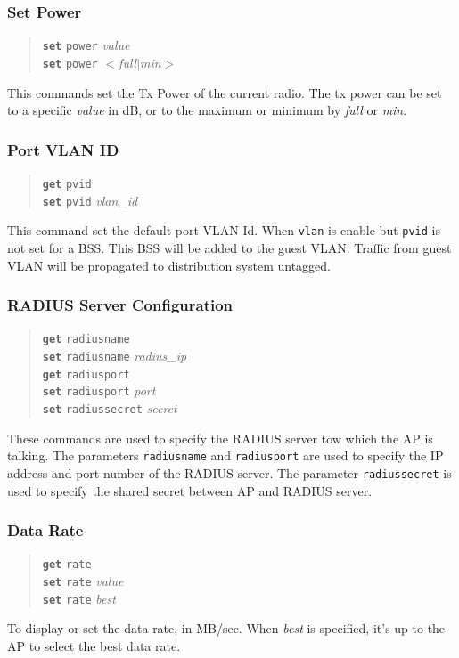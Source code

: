 \documentclass[10pt,fullpage]{article}
\newcommand{\bv}{\begin{verse}}
\newcommand{\ev}{\end{verse}}
\newcommand{\clicmd}[1]{{\textbf{\texttt{#1}}}}
\newcommand{\cliparam}[1]{{\texttt{#1}}}
\newcommand{\clival}[1]{{\emph{#1}}}
\begin{document}
\subsubsection{Set Power}
\bv
\clicmd{set} \cliparam{power} \clival{value}\\
\clicmd{set} \cliparam{power} $<$\clival{full}$|$\clival{min}$>$
\ev
This commands set the Tx Power of the current radio. The tx power can be set to a specific 
\clival{value} in dB, or to the maximum or minimum by \clival{full} or \clival{min}.

\subsubsection{Port VLAN ID}
\bv
\clicmd{get} \cliparam{pvid}\\
\clicmd{set} \cliparam{pvid} \clival{vlan\_id}
\ev
This command set the default port VLAN Id. When \cliparam{vlan} is enable but \cliparam{pvid}
is not set for a BSS. This BSS will be added to the guest VLAN. Traffic from guest VLAN will
be propagated to distribution system untagged.

\subsubsection{RADIUS Server Configuration}
\bv
\clicmd{get} \cliparam{radiusname}\\
\clicmd{set} \cliparam{radiusname} \clival{radius\_ip}\\
\clicmd{get} \cliparam{radiusport}\\
\clicmd{set} \cliparam{radiusport} \clival{port}\\
\clicmd{set} \cliparam{radiussecret} \clival{secret}
\ev
These commands are used to specify the RADIUS server tow which the AP
is talking.  The parameters \cliparam{radiusname} and
\cliparam{radiusport} are used to specify the IP address and port
number of the RADIUS server.  The parameter \cliparam{radiussecret} is
used to specify the shared secret between AP and RADIUS server.

\subsubsection{Data Rate}
\bv
\clicmd{get} \cliparam{rate}\\
\clicmd{set} \cliparam{rate} \clival{value}\\
\clicmd{set} \cliparam{rate} \clival{best}
\ev
To display or set the data rate, in MB/sec. When \clival{best} is specified, 
it's up to the AP to select the best data rate.
\end{document}
